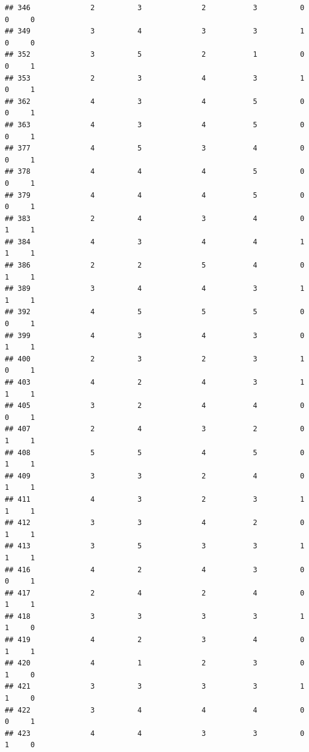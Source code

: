 \documentclass[
]{article}
\begin{document}
\begin{verbatim}
## 346              2          3              2           3          0    0     0
## 349              3          4              3           3          1    0     0
## 352              3          5              2           1          0    0     1
## 353              2          3              4           3          1    0     1
## 362              4          3              4           5          0    0     1
## 363              4          3              4           5          0    0     1
## 377              4          5              3           4          0    0     1
## 378              4          4              4           5          0    0     1
## 379              4          4              4           5          0    0     1
## 383              2          4              3           4          0    1     1
## 384              4          3              4           4          1    1     1
## 386              2          2              5           4          0    1     1
## 389              3          4              4           3          1    1     1
## 392              4          5              5           5          0    0     1
## 399              4          3              4           3          0    1     1
## 400              2          3              2           3          1    0     1
## 403              4          2              4           3          1    1     1
## 405              3          2              4           4          0    0     1
## 407              2          4              3           2          0    1     1
## 408              5          5              4           5          0    1     1
## 409              3          3              2           4          0    1     1
## 411              4          3              2           3          1    1     1
## 412              3          3              4           2          0    1     1
## 413              3          5              3           3          1    1     1
## 416              4          2              4           3          0    0     1
## 417              2          4              2           4          0    1     1
## 418              3          3              3           3          1    1     0
## 419              4          2              3           4          0    1     1
## 420              4          1              2           3          0    1     0
## 421              3          3              3           3          1    1     0
## 422              3          4              4           4          0    0     1
## 423              4          4              3           3          0    1     0

\end{verbatim}
\end{document}
